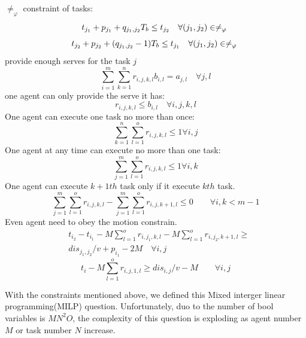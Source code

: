 $\neq_{\varphi}$ constraint of tasks:
\begin{equation}
t_{j_1}+p_{j_1}+q_{j_1,j_2}T_b\leq t_{j_2}\quad  \forall (j_1,j_2)\in \neq_{\varphi}\\
\label{1.5}
\end{equation}
\begin{equation}
t_{j_2}+p_{j_2}+(q_{j_1,j_2}-1)T_b\leq t_{j_1} \quad  \forall (j_1,j_2)\in \neq_{\varphi}\\
\label{1.8}
\end{equation}
provide enough serves for the task $j$
\begin{equation}
\sum_{i=1}^{m}\sum_{k=1}^{n}r_{i,j,k,l}b_{i,l}= a_{j,l}   \quad \forall j,l
\label{2}
\end{equation}
one agent can only provide the serve it has:
\begin{equation}
r_{i,j,k,l}\leq b_{i,l}   \quad \forall i,j,k,l
\label{3}
\end{equation}
One agent can execute one task no more than once:
\begin{equation}
\sum_{k=1}^{n}\sum_{l=1}^{o}r_{i,j,k,l} \leq 1   \forall i,j
\label{4}
\end{equation}
One agent at any time can execute no more than one task:
\begin{equation}
\sum_{j=1}^{m}\sum_{l=1}^{o}r_{i,j,k,l} \leq 1    \forall i,k
\label{5}
\end{equation}
One agent can execute $k+1th$ task only if it execute $kth$ task.
\begin{equation}
\sum_{j=1}^{m}\sum_{l=1}^{o}r_{i,j,k,l} - \sum_{j=1}^{m}\sum_{l=1}^{o}r_{i,j,k+1,l}\leq  0    \qquad\forall i,k<m-1
\label{6}
\end{equation}
Even agent need to obey the motion constrain.
\begin{equation}
\begin{aligned}
&t_{i_2}-t_{i_1} -M\sum_{l=1}^o r_{i,j_1,k,l}-M\sum_{l=1}^o r_{i,j_2,k+1,l}  \geq\\
& dis_{j_1,j_2}/v+p_{i_1}-2M \quad   \forall i,j
\end{aligned}
\label{7}
\end{equation}
\begin{equation}
t_{i} -M\sum_{l=1}^o r_{i,j,1,l} \geq dis_{i,j}/v-M \qquad  \forall i,j
\label{8}
\end{equation}

With the constraints mentioned above, we defined this Mixed interger linear programming(MILP) question. 
Unfortunately, duo to the number of bool variables
is $MN^2O$, the complexity of this question is exploding as agent number $M$ or task number $N$ increase.
 


